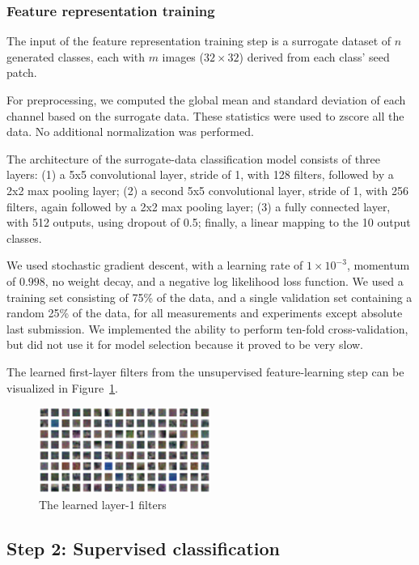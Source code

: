 \documentclass{article} %
\begin{document}
\subsubsection{Feature representation training}
The input of the feature representation training step is a surrogate dataset of $n$ generated classes, each with $m$ images ($32\times32$) derived from each class' seed patch.

For preprocessing, we computed the global mean and standard deviation of each channel based on the surrogate data. These statistics were used to zscore all the data. No additional normalization was performed.

The architecture of the surrogate-data classification model consists of three layers: (1) a 5x5 convolutional layer, stride of 1, with 128 filters, followed by a 2x2 max pooling layer; (2) a second 5x5 convolutional layer, stride of 1, with 256 filters, again followed by a 2x2 max pooling layer; (3) a fully connected layer, with 512 outputs, using dropout of 0.5; finally, a linear mapping to the 10 output classes.

We used stochastic gradient descent, with a learning rate of $1 \times 10^{-3}$, momentum of $0.998$, no weight decay, and a negative log likelihood loss function. We used a training set consisting of 75\% of the data, and a single validation set containing a random 25\% of the data, for all measurements and experiments except absolute last submission. We implemented the ability to perform ten-fold cross-validation, but did not use it for model selection because it proved to be very slow.

The learned first-layer filters from the unsupervised feature-learning step can be visualized in Figure~\ref{figfilt}.

\begin{figure}[h]
\centering
\includegraphics[width=0.5\textwidth]{figs/filter_sur.png}
\caption{The learned layer-1 filters}
\label{figfilt}
\end{figure}


\subsection{Step 2: Supervised classification}
\end{document}
